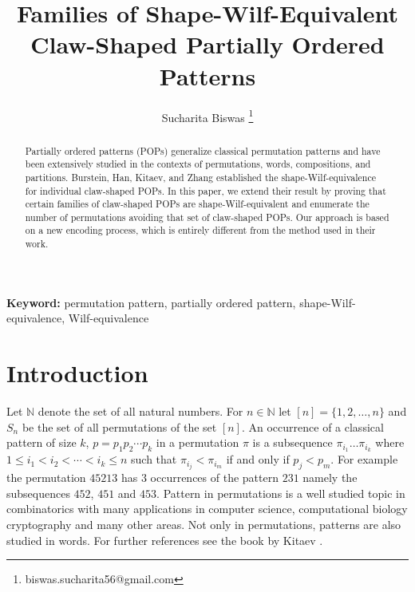 \documentclass[12pt, english, a4paper]{article}
\title{Families of Shape-Wilf-Equivalent Claw-Shaped Partially Ordered Patterns}
\author{Sucharita Biswas
\thanks{{biswas.sucharita56@gmail.com}}}
\affil{Department of Mathematics, Indian Institute of Technology, Bombay, Mumbai 400076, India}
\theoremstyle{plain}
\theoremstyle{definition}
\theoremstyle{remark}
\begin{document}
\maketitle
\begin{abstract}
Partially ordered patterns (POPs) generalize classical permutation patterns and have been extensively studied in the contexts of permutations, words, compositions, and partitions. Burstein, Han, Kitaev, and Zhang established the shape-Wilf-equivalence for individual claw-shaped POPs. In this paper, we extend their result by proving that certain families of claw-shaped POPs are shape-Wilf-equivalent and enumerate the number of permutations avoiding that set of claw-shaped POPs. Our approach is based on a new encoding process, which is entirely different from the method used in their work.
\end{abstract}
\textbf{\small{Keyword:}}{\small{} permutation pattern, partially ordered pattern, shape-Wilf-equivalence, Wilf-equivalence }{\let\thefootnote\relax{}}
\section{Introduction}
Let $\mathbb{N}$ denote the set of all natural numbers. For $n \in \mathbb{N}$ let $[n]=\{1,2,\ldots , n\}$ and $S_n$ be the set of all permutations of the set $[n]$. An occurrence of a classical pattern of size $k$, $p=p_1p_2\cdots p_k$ in a permutation $\pi$ is a subsequence $\pi_{i_1}\dots\pi_{i_k}$ where $1\leq i_1<i_2<\cdots <i_k\leq n$ such that $\pi_{i_j}<\pi_{i_m}$ if and only if $p_j<p_m$. For example the permutation $45213$ has $3$ occurrences of  the pattern $231$ namely the subsequences $452$, $451$ and $453$. Pattern in permutations is a well studied topic in combinatorics with many applications in computer science, computational biology cryptography and many other areas. Not only in permutations, patterns are also studied in words. For further references see the book by Kitaev \cite{kitaev-patterns-words}. 
\end{document}
